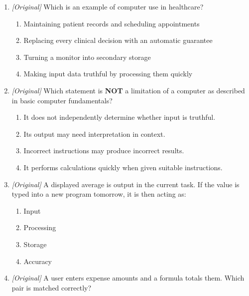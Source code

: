 \begin{enumerate}[label=\textbf{Q\arabic*.}, leftmargin=*]
\begin{enumerate}[label=\Roman*.]
  \end{enumerate}
  \begin{enumerate}[label=\Alph*.]
    \item I only
    \item I and II only
    \item II and III only
    \item I, II, and III
  \end{enumerate}
\item \textit{[Original]} Which is an example of computer use in
  healthcare?
  \begin{enumerate}[label=\Alph*.]
    \item Maintaining patient records and scheduling appointments
    \item Replacing every clinical decision with an automatic guarantee
    \item Turning a monitor into secondary storage
    \item Making input data truthful by processing them quickly
  \end{enumerate}
\item \textit{[Original]} Which statement is \textbf{NOT} a limitation of a
  computer as described in basic computer fundamentals?
  \begin{enumerate}[label=\Alph*.]
    \item It does not independently determine whether input is truthful.
    \item Its output may need interpretation in context.
    \item Incorrect instructions may produce incorrect results.
    \item It performs calculations quickly when given suitable instructions.
  \end{enumerate}
\item \textit{[Original]} A displayed average is output in the current task.
  If the value is typed into a new program tomorrow, it is then acting as:
  \begin{enumerate}[label=\Alph*.]
    \item Input
    \item Processing
    \item Storage
    \item Accuracy
  \end{enumerate}
\item \textit{[Original]} A user enters expense amounts and a formula totals
  them. Which pair is matched correctly?
  \begin{enumerate}[label=\Alph*.]

\end{enumerate}
\end{enumerate}
